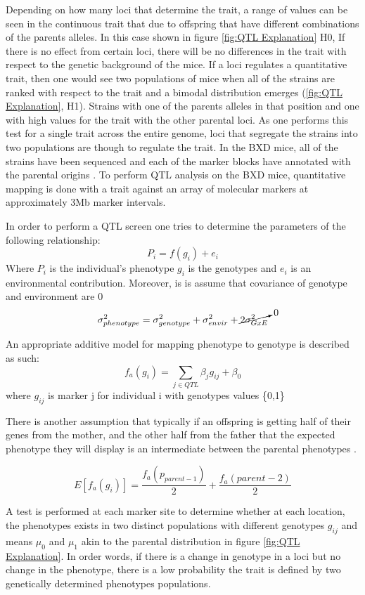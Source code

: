 \documentclass[a4paper,11pt,twoside]{book}
\begin{document}
	Depending on how many loci that determine the trait, a range of values can be seen in the continuous trait that due to offspring that have different combinations of the parents alleles. In this case shown in figure \ref{fig:QTL Explanation} H0, If there is no effect from certain loci, there will be no differences in the trait with respect to the genetic background of the mice. If a loci regulates a quantitative trait, then one would see two populations of mice when all of the strains are ranked with respect to the trait and a bimodal distribution emerges (\ref{fig:QTL Explanation}, H1). Strains with one of the parents alleles in that position and one with high values for the trait with the other parental loci\citep{Mackay2009TheProspects}. As one performs this test for a single trait across the entire genome, loci that segregate the strains into two populations are though to regulate the trait. In the BXD mice, all of the strains have been sequenced and each of the marker blocks have annotated with the parental origins \citep{Mulligan2017GeneNetworkGenetics}.  To perform QTL analysis on the BXD mice, quantitative mapping is done with a trait against an array of molecular markers at approximately 3Mb marker intervals. 
	

	In order to perform a QTL screen one tries to determine the parameters of the following relationship:
	$$P_i = f(g_i) + e_i $$
	Where $P_i$ is the individual's phenotype
	$g_i$ is the genotypes and $e_i$ is an environmental contribution.
	Moreover, is is assume that covariance of genotype and environment are 0 \citep{Broman2009AR/qtl}
	$$ \sigma_{phenotype}^2 = \sigma_{genotype}^2 + \sigma_{envir}^2 + \cancelto{0}{2{\sigma_{G x E}^2}} $$
	
	An appropriate additive model for mapping phenotype to genotype is described as such:
	$$ f_a(g_i) = \sum_{j \in QTL }\beta_jg_{ij} + \beta_0 $$
	where $g_{ij}$ is marker j for individual i with genotypes values \{0,1\} 
	
	There is another assumption that typically if an offspring is getting half of their genes from the mother, and the other half from the father that the expected phenotype they will display is an intermediate between the parental phenotypes \citep{Broman2009AR/qtl}.
	
	$$ E[f_a(g_i)] = \dfrac{f_a(p_{parent-1})}{2} + \dfrac{f_a(parent-2)}{2}$$
	
	A test is performed at each marker site to determine whether at each location, the phenotypes exists in two distinct populations with different genotypes $g_{ij}$ and means $\mu_0$ and $\mu_1$ akin to the parental distribution in figure \ref{fig:QTL Explanation}. In order words, if there is a change in genotype in a loci but no change in the phenotype, there is a low probability the trait is defined by two genetically determined phenotypes populations\citep{Broman2009AR/qtl}.
	
\end{document}
